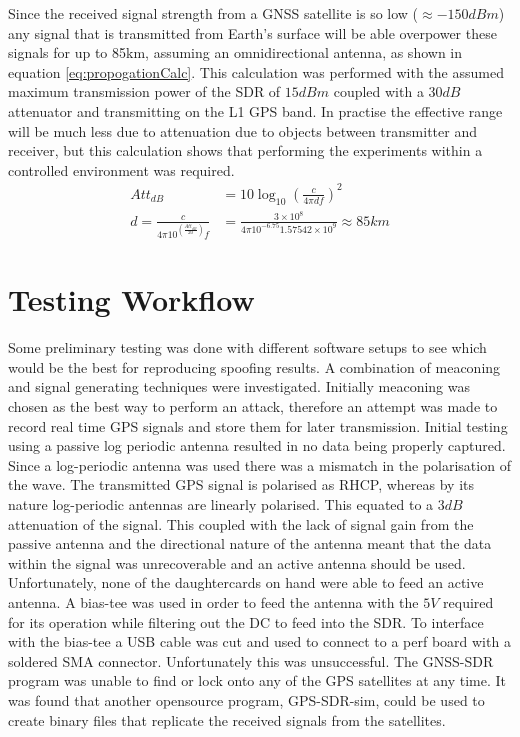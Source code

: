 Since the received signal strength from a GNSS satellite is so low ($\approx -150dBm$) any signal that is transmitted from Earth's surface will be able overpower these
signals for up to 85km, assuming an omnidirectional antenna, as shown in equation \ref{eq:propogationCalc}. This calculation was performed with the assumed maximum
transmission power of the SDR of $15 dBm$ coupled with a $30dB$ attenuator and transmitting on the L1 GPS band. In practise the effective range will be much less due to
attenuation due to objects between transmitter and receiver, but this calculation shows that performing the experiments within a controlled environment was required.
\begin{equation}    
    \begin{split} \label{eq:propogationCalc}
        Att_{dB} &= 10 \log_{10}\left(\frac{c}{4\pi df}\right)^2 \\
        d = \frac{c}{4\pi 10^{\left(\frac{Att_{dB}}{20}\right)}f} &= \frac{3\times10^8}{4\pi 10^{-6.75}1.57542\times 10^9} \approx 85km
    \end{split}
\end{equation}


\section{Testing Workflow}

Some preliminary testing was done with different software setups to see which would be the best for reproducing spoofing results. A combination of meaconing and signal
generating techniques were investigated. Initially meaconing was chosen as the best way to perform an attack, therefore an attempt was made to record real time GPS signals
and store them for later transmission. Initial testing using a passive log periodic antenna resulted in no data being properly captured. Since a log-periodic antenna was
used there was a mismatch in the polarisation of the wave. The transmitted GPS signal is polarised as RHCP, whereas by its nature log-periodic antennas are linearly
polarised. This equated to a $3dB$ attenuation of the signal. This coupled with the lack of signal gain from the passive antenna and the directional nature of the antenna
meant that the data within the signal was unrecoverable and an active antenna should be used. Unfortunately, none of the daughtercards on hand were able to feed an active
antenna. A bias-tee was used in order to feed the antenna with the $5V$ required for its operation while filtering out the DC to feed into the SDR. To interface with the
bias-tee a USB cable was cut and used to connect to a perf board with a soldered SMA connector. Unfortunately this was unsuccessful. The GNSS-SDR program was unable to
find or lock onto any of the GPS satellites at any time. It was found that another opensource program, GPS-SDR-sim, could be used to create binary files that replicate
the received signals from the satellites. 

